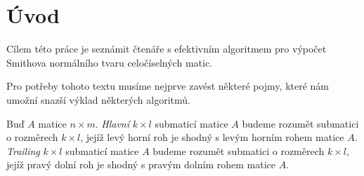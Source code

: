 \chapter*{Úvod}

Cílem této práce je seznámit čtenáře s efektivním algoritmem pro výpočet Smithova normálního tvaru celočíselných matic.

Pro potřeby tohoto textu musíme nejprve zavést některé pojmy, které
nám umožní snazší výklad některých algoritmů.

\begin{defi}\label{hlavni_submatice}
    Buď $ A $ matice $ n \times m $. \textit{Hlavní} $ k \times l $ submaticí matice $ A $
    budeme rozumět submatici o rozměrech $ k \times l $, jejíž levý horní roh
    je shodný s levým horním rohem matice $ A $.
    \textit{Trailing} $ k \times l $ submaticí matice $ A $ budeme rozumět submatici o
    rozměrech $ k \times l $, jejíž pravý dolní roh je shodný s pravým dolním
    rohem matice $ A $.
\end{defi}

\cleardoublepage

